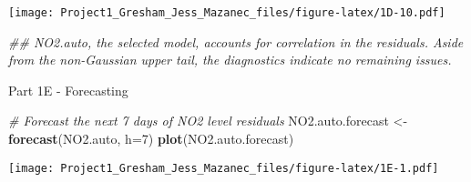 \documentclass[
]{article}
\newenvironment{Shaded}{\begin{snugshade}}{\end{snugshade}}
\newcommand{\CommentTok}[1]{\textcolor[rgb]{0.56,0.35,0.01}{\textit{#1}}}
\newcommand{\DataTypeTok}[1]{\textcolor[rgb]{0.13,0.29,0.53}{#1}}
\newcommand{\DecValTok}[1]{\textcolor[rgb]{0.00,0.00,0.81}{#1}}
\newcommand{\KeywordTok}[1]{\textcolor[rgb]{0.13,0.29,0.53}{\textbf{#1}}}
\newcommand{\NormalTok}[1]{#1}
\newcommand{\OperatorTok}[1]{\textcolor[rgb]{0.81,0.36,0.00}{\textbf{#1}}}
\newcommand{\StringTok}[1]{\textcolor[rgb]{0.31,0.60,0.02}{#1}}
\begin{document}
\begin{Shaded}
\end{Shaded}

\texttt{[image: Project1\_Gresham\_Jess\_Mazanec\_files/figure-latex/1D-10.pdf]}

\begin{Shaded}
\begin{Highlighting}[]
\CommentTok{## NO2.auto, the selected model, accounts for correlation in the residuals. Aside from the non-Gaussian upper tail, the diagnostics indicate no remaining issues.}
\end{Highlighting}
\end{Shaded}

Part 1E - Forecasting

\begin{Shaded}
\begin{Highlighting}[]
\CommentTok{# Forecast the next 7 days of NO2 level residuals}
\NormalTok{NO2.auto.forecast <-}\StringTok{ }\KeywordTok{forecast}\NormalTok{(NO2.auto, }\DataTypeTok{h=}\DecValTok{7}\NormalTok{)}
\KeywordTok{plot}\NormalTok{(NO2.auto.forecast)}
\end{Highlighting}
\end{Shaded}

\texttt{[image: Project1\_Gresham\_Jess\_Mazanec\_files/figure-latex/1E-1.pdf]}
\end{document}
